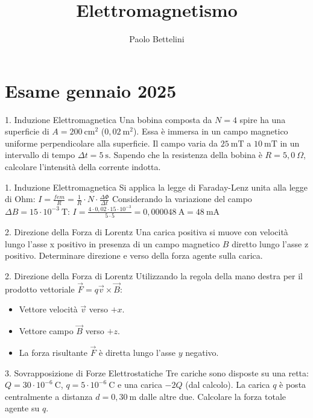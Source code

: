 \documentclass[a4paper]{article}
\title{Elettromagnetismo}
\author{Paolo Bettelini}
\date{}
\begin{document}
\maketitle
\tableofcontents
\pagebreak
\section{Esame gennaio 2025}

\begin{snippetexercise}{1. Induzione Elettromagnetica}
    Una bobina composta da \(N=4\) spire ha una superficie di \(A=200~\mathrm{cm}^{2}\) (\(0,02~\mathrm{m}^2\)). Essa è immersa in un campo magnetico uniforme perpendicolare alla superficie. Il campo varia da \(25~\mathrm{mT}\) a \(10~\mathrm{mT}\) in un intervallo di tempo \(\Delta t=5~\mathrm{s}\). Sapendo che la resistenza della bobina è \(R=5,0~\Omega\), calcolare l'intensità della corrente indotta.
\end{snippetexercise}
\begin{snippetsolution}{1. Induzione Elettromagnetica}
    Si applica la legge di Faraday-Lenz unita alla legge di Ohm:
    \(I = \frac{fem}{R} = \frac{1}{R} \cdot N \cdot \frac{\Delta\Phi}{\Delta t}\)
    Considerando la variazione del campo \(\Delta B = 15 \cdot 10^{-3}~\mathrm{T}\):
    \(I = \frac{4 \cdot 0,02 \cdot 15 \cdot 10^{-3}}{5 \cdot 5} = 0,000048~\mathrm{A} = 48~\mathrm{mA}\)
\end{snippetsolution}
\begin{snippetexercise}{2. Direzione della Forza di Lorentz}
    Una carica positiva si muove con velocità lungo l'asse x positivo in presenza di un campo magnetico \(B\) diretto lungo l'asse z positivo. Determinare direzione e verso della forza agente sulla carica.
\end{snippetexercise}
\begin{snippetsolution}{2. Direzione della Forza di Lorentz}
    Utilizzando la regola della mano destra per il prodotto vettoriale \(\vec{F} = q\vec{v} \times \vec{B}\):
    \begin{itemize}[nosep]
        \item Vettore velocità \(\vec{v}\) verso \(+x\).
        \item Vettore campo \(\vec{B}\) verso \(+z\).
        \item La forza risultante \(\vec{F}\) è diretta lungo l'asse \(y\) negativo.
    \end{itemize}
\end{snippetsolution}
\begin{snippetexercise}{3. Sovrapposizione di Forze Elettrostatiche}
    Tre cariche sono disposte su una retta: \(Q=30\cdot10^{-6}~\mathrm{C}\), \(q=5\cdot10^{-6}~\mathrm{C}\) e una carica \(-2Q\) (dal calcolo). La carica \(q\) è posta centralmente a distanza \(d=0,30~\mathrm{m}\) dalle altre due. Calcolare la forza totale agente su \(q\).
\end{snippetexercise}
\end{document}
